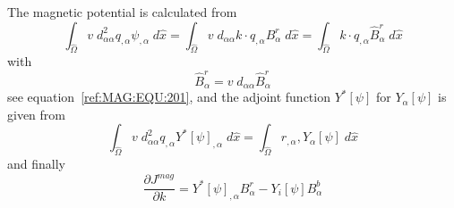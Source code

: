The magnetic potential is calculated from 
\begin{equation}\label{ref:MAG:EQU:302}
\int_{\widehat{\Omega}} v \; d_{\alpha \alpha}^2 q_{,\alpha} \psi_{,\alpha} \;  d\widehat{x}  
=  \int_{\widehat{\Omega}} v \; d_{\alpha \alpha} k \cdot q_{,\alpha}  B^r_{\alpha} \; d\widehat{x}   
=  \int_{\widehat{\Omega}}  k \cdot q_{,\alpha}  \widehat{B}^r_{\alpha} \; d\widehat{x}   
\end{equation} 
with 
\begin{equation}\label{ref:MAG:EQU:302b}
\widehat{B}^r_{\alpha}  =v \; d_{\alpha \alpha} \widehat{B}^r_{\alpha}
\end{equation} 
see equation~\ref{ref:MAG:EQU:201}, and the adjoint function $Y^*[\psi]$ for $Y_{\alpha}[\psi]$ is given from
\begin{equation}\label{ref:MAG:EQU:303}
\int_{\widehat{\Omega}} v \; d_{\alpha \alpha}^2 q_{,\alpha} Y^*[\psi]_{,\alpha } \;d\widehat{x}  =
\int_{\widehat{\Omega}} r_{,{\alpha}} ,Y_{\alpha}[\psi]  \;d\widehat{x}
\end{equation} 
and finally 
\begin{equation}\label{ref:MAG:EQU:310}
\frac{\partial J^{mag}}{\partial k} = Y^*[\psi]_{,{\alpha}}  B^r_{\alpha} - Y_i[\psi] B^b_{\alpha}
\end{equation} 

